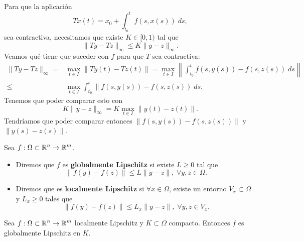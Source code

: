 Para que la aplicación 
\[Tx\left(t\right)=x_{0}+\int^{t}_{t_{0}} f\left(s, x\left(s\right)\right) \; d s ,\]
sea contractiva, necesitamos que existe $\displaystyle K \in [0,1) $ tal que 
\[\|Ty-Tz\|_{\infty} \leq K \|y-z\|_{\infty} .\]
Veamos qué tiene que suceder con $\displaystyle f $ para que $\displaystyle T $ sea contractiva:
\[
\begin{split}
	\|Ty-Tz\|_{\infty} = & \max _{t \in I} \|Ty\left(t\right)-Tz\left(t\right)\| = \max_{t \in I}\left\|\int^{t}_{t_{0}} f\left(s,y\left(s\right)\right)-f\left(s, z\left(s\right)\right) \; d s\right\|  \\
	\leq & \max _{t \in I}\int^{t}_{t_{0}} \|f\left(s,y\left(s\right)\right)-f\left(s, z\left(s\right)\right) \; d s.
\end{split}
\]
Tenemos que poder comparar esto con 
\[K \|y -z\|_{\infty} = K\max_{t \in I}\|y\left(t\right)-z\left(t\right)\| .\]
Tendríamos que poder comparar entonces $\displaystyle \|f\left(s, y\left(s\right)\right)-f\left(s, z\left(s\right)\right)\| $ y $\displaystyle \|y\left(s\right)-z\left(s\right)\| $.
\begin{definition}
Sea $\displaystyle f : \Omega \subset \mathbb{R}^{n} \to \mathbb{R}^{m} $.
\begin{itemize}
\item Diremos que $\displaystyle f $ es \textbf{globalmente Lipschitz} si existe $\displaystyle L \geq 0 $ tal que 
	\[ \|f\left(y\right)-f\left(z\right)\| \leq L \|y-z\|, \; \forall y,z \in \Omega  .\]
\item Diremos que es \textbf{localmente Lipschitz} si $\displaystyle \forall x \in \Omega  $, existe un entorno $\displaystyle V_{x}\subset \Omega $ y $\displaystyle L _{x}\geq 0 $ tales que 
	\[\|f\left(y\right)-f\left(z\right)\| \leq L_{x}\|y-z\|, \; \forall y,z \in V_{x} .\]
\end{itemize}
\end{definition}
\begin{prop}
Sea $\displaystyle f: \Omega\subset \mathbb{R}^{n} \to \mathbb{R}^{m} $ localmente Lipschitz y $\displaystyle K \subset \Omega  $ compacto. Entonces $\displaystyle f $ es globalmente Lipschitz en $\displaystyle K $. 
\end{prop}
